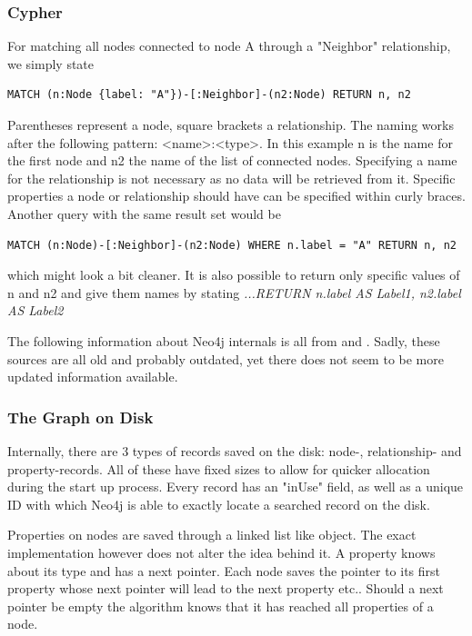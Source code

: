 \subsubsection{Cypher}
For matching all nodes connected to node A through a "Neighbor" relationship, we simply state
\lstset{language=Cypher}
\begin{lstlisting}[label={ex231},caption={Matching Nodes Way 1}]
MATCH (n:Node {label: "A"})-[:Neighbor]-(n2:Node) RETURN n, n2
\end{lstlisting}
Parentheses represent a node, square brackets a relationship. The naming works after the following pattern: <name>:<type>. In this example n is the name for the first node and n2 the name of the list of connected nodes. Specifying a name for the relationship is not necessary as no data will be retrieved from it. Specific properties a node or relationship should have can be specified within curly braces. Another query with the same result set would be
\begin{lstlisting}[label={ex232},caption={Matching Nodes Way 2}]
MATCH (n:Node)-[:Neighbor]-(n2:Node) WHERE n.label = "A" RETURN n, n2
\end{lstlisting}
which might look a bit cleaner. It is also possible to return only specific values of n and n2 and give them names by stating
\emph{ ...RETURN n.label AS Label1, n2.label AS Label2 }

The following information about Neo4j internals is all from \cite{NeoInternals} and \cite{Neo4jInternalsPP}. Sadly, these sources are all old and probably outdated, yet there does not seem to be more updated information available.

\subsubsection{The Graph on Disk}
Internally, there are 3 types of records saved on the disk: node-, relationship- and property-records. All of these have fixed sizes to allow for quicker allocation during the start up process. Every record has an "inUse" field, as well as a unique ID with which Neo4j is able to exactly locate a searched record on the disk. \citep[minute 08]{NeoInternals}

Properties on nodes are saved through a linked list like object. The exact implementation however does not alter the idea behind it. A property knows about its type and has a next pointer. Each node saves the pointer to its first property whose next pointer will lead to the next property etc.. Should a next pointer be empty the algorithm knows that it has reached all properties of a node.

